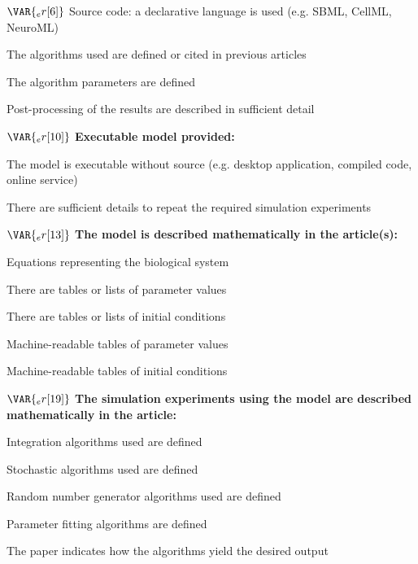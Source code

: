 \documentclass{article}
\begin{document}
\begin{tcolorbox}
\begin{todolist}
  \item[$\VAR{_er[6]}$] Source code: a declarative language is used (e.g. SBML, CellML, NeuroML)
  \begin{todolist}
    \item[\VAR{_er[7]}] The algorithms used are defined or cited in previous articles
    \item[\VAR{_er[8]}] The algorithm parameters are defined
    \item[\VAR{_er[9]}] Post-processing of the results are described in sufficient detail
  \end{todolist}
\end{todolist}
$\VAR{_er[10]}$ \textbf{Executable model provided:}
\begin{todolist}
    \item[\VAR{_er[11]}] The model is executable without source (e.g. desktop application, compiled code, online service)
    \begin{todolist}
        \item[\VAR{_er[12]}] There are sufficient details to repeat the required simulation experiments
    \end{todolist}
\end{todolist}
$\VAR{_er[13]}$ \textbf{The model is described mathematically in the article(s):}
\begin{todolist}
    \item[\VAR{_er[14]}] Equations representing the biological system
    \item[\VAR{_er[15]}] There are tables or lists of parameter values
    \item[\VAR{_er[16]}] There are tables or lists of initial conditions
    \item[\VAR{_er[17]}] Machine-readable tables of parameter values
    \item[\VAR{_er[18]}] Machine-readable tables of initial conditions
\end{todolist}
$\VAR{_er[19]}$ \textbf{The simulation experiments using the model are described mathematically in the article:}
\begin{todolist}
    \item[\VAR{_er[20]}] Integration algorithms used are defined
    \item[\VAR{_er[21]}] Stochastic algorithms used are defined
    \item[\VAR{_er[22]}] Random number generator algorithms used are defined
    \item[\VAR{_er[23]}] Parameter fitting algorithms are defined
    \item[\VAR{_er[24]}] The paper indicates how the algorithms yield the desired output
\end{todolist}
\end{tcolorbox}
\end{document}
